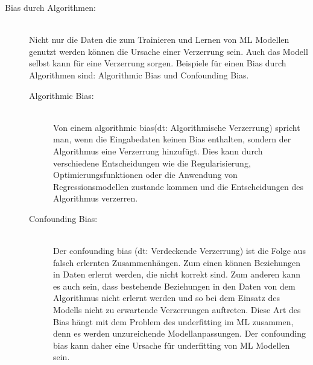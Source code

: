 \begin{onehalfspace}
\begin{description}
            \item [Bias durch Algorithmen:] \hfill \\
            Nicht nur die Daten die zum Trainieren und Lernen von \ac*{ML} Modellen genutzt werden können die Ursache einer Verzerrung sein. Auch das Modell selbst kann für eine Verzerrung sorgen. Beispiele für einen Bias durch Algorithmen sind: Algorithmic Bias und Confounding Bias.
            \begin{description}
                \item [Algorithmic Bias:] \hfill \\
                Von einem \glqq{}algorithmic bias\grqq{}(\ac*{dt}: Algorithmische Verzerrung) spricht man, wenn die Eingabedaten keinen Bias enthalten, sondern der Algorithmus eine Verzerrung hinzufügt. Dies kann durch verschiedene Entscheidungen wie die Regularisierung, Optimierungsfunktionen oder die Anwendung von Regressionsmodellen zustande kommen und die Entscheidungen des Algorithmus verzerren.\cite{srinivasan2021biases}\cite{Mehrabi2021}
                \item [Confounding Bias:] \hfill \\
                Der \glqq{}confounding bias\grqq{} (\ac*{dt}: Verdeckende Verzerrung) ist die Folge aus falsch erlernten Zusammenhängen. Zum einen können Beziehungen in Daten erlernt werden, die nicht korrekt sind. Zum anderen kann es auch sein, dass bestehende Beziehungen in den Daten von dem Algorithmus nicht erlernt werden und so bei dem Einsatz des Modells nicht zu erwartende Verzerrungen auftreten. Diese Art des Bias hängt mit dem Problem des underfitting im \ac*{ML} zusammen, denn es werden unzureichende Modellanpassungen. Der confounding bias kann daher eine Ursache für underfitting von \ac*{ML} Modellen sein.\cite{srinivasan2021biases}
            \end{description}
                

\end{description}
\end{onehalfspace}
